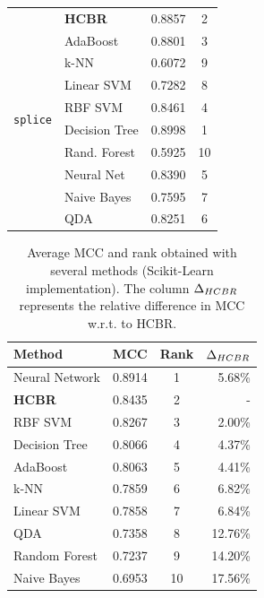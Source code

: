 \documentclass[preprint,12pt]{elsarticle}
\def\HCBR{{\sc HCBR}}
\def\bfHCBR{{\sc \bf HCBR}}
\theoremstyle{definition}
\begin{document}
\begin{table}[h!]
\begin{minipage}{.5\linewidth}
\begin{tabular}{|c|l|l|c|}
\multirow{10}{*}{\texttt{splice}} & \bfHCBR & 0.8857 & 2 \\
& AdaBoost & 0.8801 & 3\\
& k-NN & 0.6072 & 9\\
& Linear SVM & 0.7282 & 8\\
& RBF SVM & 0.8461 & 4 \\
& Decision Tree & 0.8998 & 1\\
& Rand. Forest & 0.5925 & 10\\
& Neural Net & 0.8390 & 5\\
& Naive Bayes & 0.7595 & 7\\
& QDA & 0.8251 & 6\\ \hline
\end{tabular}
\end{minipage}
  \label{table:prev_results}
\end{table}

\begin{table}[h!]
\begin{center}
  \caption{Average MCC and rank obtained with several methods (Scikit-Learn implementation). The column $\Delta_{\HCBR}$ represents the relative difference in MCC w.r.t. to \HCBR.}
  \begin{small}
\begin{tabular}{|l|c|c|r|}
\hline
  Method & MCC & Rank & $\Delta_{\HCBR}$ \\ \hline
 
 Neural Network & 0.8914 & 1 & 5.68\%\\
 \bfHCBR & 0.8435 & 2 & - \\
 RBF SVM & 0.8267 & 3 & 2.00\%\\
 Decision Tree & 0.8066& 4 & 4.37\% \\
 AdaBoost & 0.8063 & 5 & 4.41\% \\
 k-NN & 0.7859 & 6 & 6.82\% \\
 Linear SVM &  0.7858 & 7 & 6.84\% \\
 QDA & 0.7358 & 8 & 12.76\% \\
 Random Forest & 0.7237 & 9 & 14.20\% \\
 Naive Bayes & 0.6953 & 10 & 17.56\% \\
 \hline
\end{tabular}
\end{small}
  \label{table:scikit_results}
\end{center}
\end{table}
\end{document}
